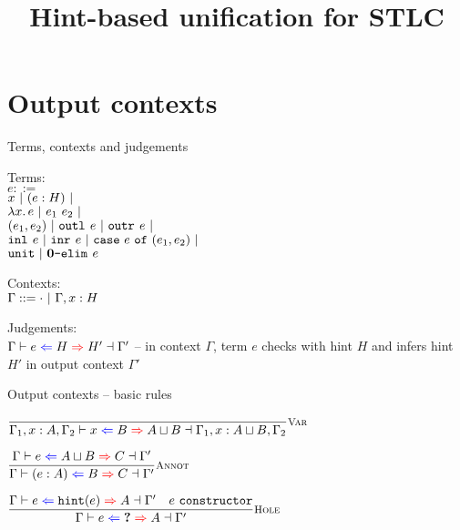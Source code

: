 \documentclass{beamer}
\title{Hint-based unification for STLC}
\date{}
\begin{document}
\frame{\titlepage}

\section{Output contexts}

\begin{frame}{Terms, contexts and judgements}

Terms: \\
$e ::=$ \\
\qquad $x \ |\  (e : H) \ |\  $ \\
\qquad $\fun{x}{e} \pipe \app{e_1}{e_2} \pipe$ \\
\qquad $(e_1, e_2) \ |\  \texttt{outl}_{}\ e \ |\  \texttt{outr}_{}\ e \ |\ $ \\
\qquad $\texttt{inl}_{}\ e \ |\  \texttt{inr}_{}\ e \ |\  \texttt{case}\ e\ \texttt{of}\ (e_1, e_2) \ |\ $ \\
\qquad $\texttt{unit} \ |\  \textbf{0}\texttt{-elim}_{}\ e$

\vspace{1em}

Contexts: \\
$\Gamma ::= \emptytypingctx \pipe \extend{\Gamma}{x}{H}$

\vspace{2em}

Judgements: \\
$\outctx[\Gamma]{e}{H}{H'}[\Gamma']$ -- in context $\Gamma$, term $e$ checks with hint $H$ and infers hint $H'$ in output context $\Gamma'$

\end{frame}

\begin{frame}{Output contexts -- basic rules}

\begin{center}
  $\infrule[Var]{}{\outctx[\Gamma_1, x : A, \Gamma_2]{x}{B}{\hintlub{A}{B}}[\Gamma_1, x : \hintlub{A}{B}, \Gamma_2]}$

  \vspace{2em}

  $\infrule[Annot]{\outctx{e}{\hintlub{A}{B}}{C}}{\outctx{\annot{e}{A}}{B}{C}}$

  \vspace{2em}

  $\infrule[Hole]{\outctx{e}{\hintfor{e}}{A} \quad \sidecond{e\ \texttt{constructor}}}{\outctx{e}{\Hole}{A}}$
\end{center}

\end{frame}
\end{document}
